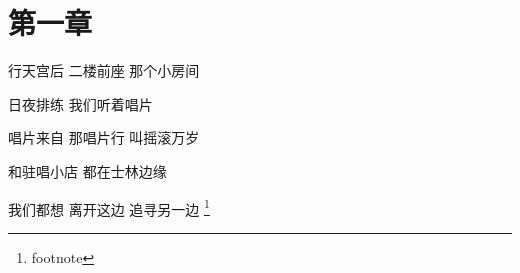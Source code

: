 \documentclass[a4paper,12pt]{ctexart}
\newcommand{\学年学期}{2020-2021学年第1学期}
\newcommand{\课程名称}{课程名填这里}
\newcommand{\论文题目}{论文题目填这里}
\newcommand{\任课教师}{教师名填这里}
\newcommand{\系别}{中国电影高新技术研究院}
\newcommand{\研究方向}{数字电影技术}
\newcommand{\姓名}{你的名字}
\newcommand{\年级}{2021}
\newcommand{\学号}{04212193}
\newcommand{\完成时间}{2023年9月3日}
\begin{document}
\makecoverpage

\section{第一章}

行天宫后 二楼前座 那个小房间

日夜排练 我们听着唱片

唱片来自 那唱片行 叫摇滚万岁

和驻唱小店 都在士林边缘

我们都想 离开这边 追寻另一边
\footnote{footnote}
\end{document}
